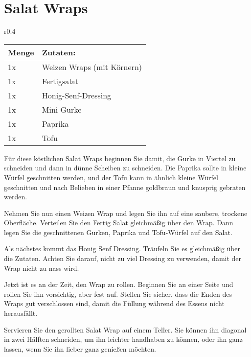\documentclass[../../book.tex]{subfiles}
\begin{document}
\section{Salat Wraps}
\begin{wraptable}{r}{0.4\textwidth}
  \centering
  \begin{tabularx}{0.39\textwidth}{|l|X|}
    \midrule
    Menge & Zutaten: \\
    \midrule
    1x & Weizen Wraps (mit Körnern) \\
    \midrule
    1x & Fertigsalat \\
    \midrule
    1x & Honig-Senf-Dressing \\
    \midrule
    1x & Mini Gurke\\
    \midrule
    1x & Paprika\\
    \midrule
    1x & Tofu\\
    \midrule
  \end{tabularx}
\end{wraptable}

Für diese köstlichen Salat Wraps beginnen Sie damit, die Gurke in Viertel zu schneiden und dann in dünne Scheiben zu schneiden. Die Paprika sollte in kleine Würfel geschnitten werden, und der Tofu kann in ähnlich kleine Würfel geschnitten und nach Belieben in einer Pfanne goldbraun und knusprig gebraten werden.

Nehmen Sie nun einen Weizen Wrap und legen Sie ihn auf eine saubere, trockene Oberfläche. Verteilen Sie den Fertig Salat gleichmäßig über den Wrap. Dann legen Sie die geschnittenen Gurken, Paprika und Tofu-Würfel auf den Salat.

Als nächstes kommt das Honig Senf Dressing. Träufeln Sie es gleichmäßig über die Zutaten. Achten Sie darauf, nicht zu viel Dressing zu verwenden, damit der Wrap nicht zu nass wird.

Jetzt ist es an der Zeit, den Wrap zu rollen. Beginnen Sie an einer Seite und rollen Sie ihn vorsichtig, aber fest auf. Stellen Sie sicher, dass die Enden des Wraps gut verschlossen sind, damit die Füllung während des Essens nicht herausfällt.

Servieren Sie den gerollten Salat Wrap auf einem Teller. Sie können ihn diagonal in zwei Hälften schneiden, um ihn leichter handhaben zu können, oder ihn ganz lassen, wenn Sie ihn lieber ganz genießen möchten.

\newpage
\end{document}
